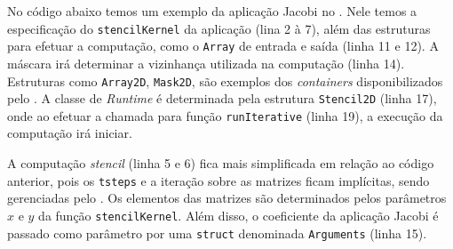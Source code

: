 No código abaixo temos um exemplo da aplicação Jacobi no \fw. Nele temos a
especificação do \texttt{stencilKernel} da aplicação (lina 2 à 7), além das estruturas para
efetuar a computação, como o \texttt{Array} de entrada e saída (linha 11 e 12).
A máscara irá determinar a vizinhança utilizada na computação (linha 14).
Estruturas como \texttt{Array2D}, \texttt{Mask2D}, são exemplos dos
\textit{containers} disponibilizados pelo \fw. A classe de \textit{Runtime} é
determinada pela estrutura \texttt{Stencil2D} (linha 17), onde ao efetuar a chamada para
função \texttt{runIterative} (linha 19), a execução da computação irá iniciar.


A computação \textit{stencil} (linha 5 e 6) fica mais simplificada em relação ao
código anterior, pois os
\texttt{tsteps} e a iteração sobre as matrizes ficam implícitas, sendo
gerenciadas pelo \fw. Os elementos das matrizes são determinados pelos
parâmetros $x$ e $y$ da função \texttt{stencilKernel}. Além disso, o coeficiente
da aplicação Jacobi é passado como parâmetro por uma \texttt{struct} denominada
\texttt{Arguments} (linha 15).

\renewcommand{\lstlistingname}{Código}


